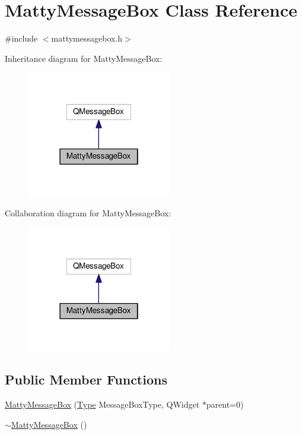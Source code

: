 \hypertarget{class_matty_message_box}{}\section{Matty\+Message\+Box Class Reference}
\label{class_matty_message_box}


{\ttfamily \#include $<$mattymessagebox.\+h$>$}



Inheritance diagram for Matty\+Message\+Box\+:
\nopagebreak
\begin{figure}[H]
\begin{center}
\leavevmode
\includegraphics[width=178pt]{class_matty_message_box__inherit__graph}
\end{center}
\end{figure}


Collaboration diagram for Matty\+Message\+Box\+:
\nopagebreak
\begin{figure}[H]
\begin{center}
\leavevmode
\includegraphics[width=178pt]{class_matty_message_box__coll__graph}
\end{center}
\end{figure}
\subsection*{Public Member Functions}
\begin{DoxyCompactItemize}
\item 
\hyperlink{class_matty_message_box_a7690be6e7b2f25d397ce8c6a7cf067a4}{Matty\+Message\+Box} (\hyperlink{mattymessagebox_8h_a1d1cfd8ffb84e947f82999c682b666a7}{Type} Message\+Box\+Type, Q\+Widget $\ast$parent=0)
\item 
\hyperlink{class_matty_message_box_ac33dcf18a7a03a04f27a893e4fff091a}{$\sim$\+Matty\+Message\+Box} ()
\end{DoxyCompactItemize}
